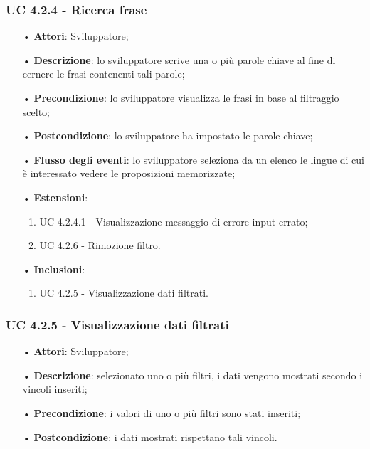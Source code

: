 \subsubsection{UC 4.2.4 - Ricerca frase}
\begin{itemize}
\item[•]\textbf{Attori}: Sviluppatore;
\item[•]\textbf{Descrizione}: lo sviluppatore scrive una o più parole chiave al fine di cernere le frasi contenenti tali parole;
\item[•]\textbf{Precondizione}: lo sviluppatore visualizza le frasi in base al filtraggio scelto;
\item[•]\textbf{Postcondizione}: lo sviluppatore ha impostato le parole chiave;
\item[•]\textbf{Flusso degli eventi}: lo sviluppatore seleziona da un elenco le lingue di cui è interessato vedere le proposizioni memorizzate;
\item[•]\textbf{Estensioni}: 
\begin{enumerate}
	\item UC 4.2.4.1 - Visualizzazione messaggio di errore input errato;
	\item UC 4.2.6 - Rimozione filtro.
\end{enumerate}
\item[•]\textbf{Inclusioni}:
\begin{enumerate}
\item UC 4.2.5 - Visualizzazione dati filtrati.
\end{enumerate}
\end{itemize}

\subsubsection{UC 4.2.5 - Visualizzazione dati filtrati}
\begin{itemize}
\item[•]\textbf{Attori}: Sviluppatore;
\item[•]\textbf{Descrizione}: selezionato uno o più filtri, i dati vengono mostrati secondo i vincoli inseriti;
\item[•]\textbf{Precondizione}: i valori di uno o più filtri sono stati inseriti;
\item[•]\textbf{Postcondizione}: i dati mostrati rispettano tali vincoli.
\end{itemize}

